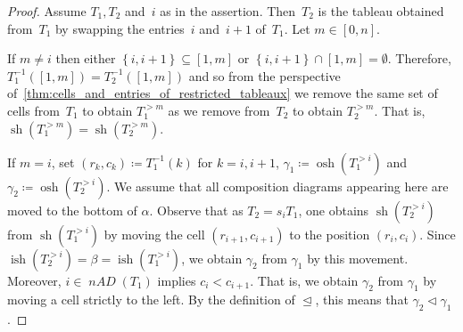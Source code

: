 \documentclass[ALCO,ThmDefs,Unicode,epreuves]{cedram}
\newcommand{\nAD}{\operatorname{\mathit{nAD}}}
\DeclareMathOperator{\sh}{sh}
\DeclareMathOperator{\osh}{osh}
\DeclareMathOperator{\ish}{ish}
\newcommand{\set}[1]{\left\{ #1 \right\}}
\newcommand{\fs}{s}
\newcommand{\dleq}{\trianglelefteq}
\newcommand{\dlneq}{\vartriangleleft}
\begin{document}
\begin{proof}
	Assume $T_1,T_2$ and~$i$ as in the assertion. Then~$T_2$ is the tableau obtained from~$T_1$ by swapping the entries~$i$ and~$i+1$ of~$T_1$. Let $m\in[0,n]$.
	 
	If $m\neq i$ then either $\set{i,i+1} \subseteq [1,m]$ or $\set{i,i+1} \cap [1,m]= \emptyset$.
	Therefore, $T_1^{-1}([1,m]) = T_2^{-1} ([1,m])$ and so from the perspective of~\cref{thm:cells_and_entries_of_restricted_tableaux} we remove the same set of cells from~$T_1$ to obtain $T_1^{>m}$ as we remove from~$T_2$ to obtain $T_2^{>m}$. That is,	$\sh(T^{>m}_1) = \sh(T^{>m}_2)$.
	
	If $m = i$, set $(r_k,c_k) \coloneqq T_1^{-1}(k)$ for $k= i,i+1$, $\gamma_1 \coloneqq \osh(T^{>i}_1)$ and $\gamma_2 \coloneqq \osh(T^{>i}_2)$. 
	We assume that all composition diagrams appearing here are moved to the bottom of $\alpha$.
	Observe that as $T_2 = \fs_i T_1$, one obtains $\sh(T^{>i}_2)$ from $\sh(T^{>i}_1)$ by moving the cell $(r_{i+1}, c_{i+1})$ to the position $(r_i,c_i)$. Since $\ish(T^{>i}_2) = \beta = \ish(T^{>i}_1)$, we obtain $\gamma_2$ from $\gamma_1$ by this movement.
	 Moreover, $i\in \nAD(T_1)$ implies $c_i < c_{i+1}$. That is, we obtain $\gamma_2$ from $\gamma_1$ by moving a cell strictly to the left. By the definition of $\dleq$, this means that $\gamma_2 \dlneq \gamma_1$.
\end{proof}
\end{document}
